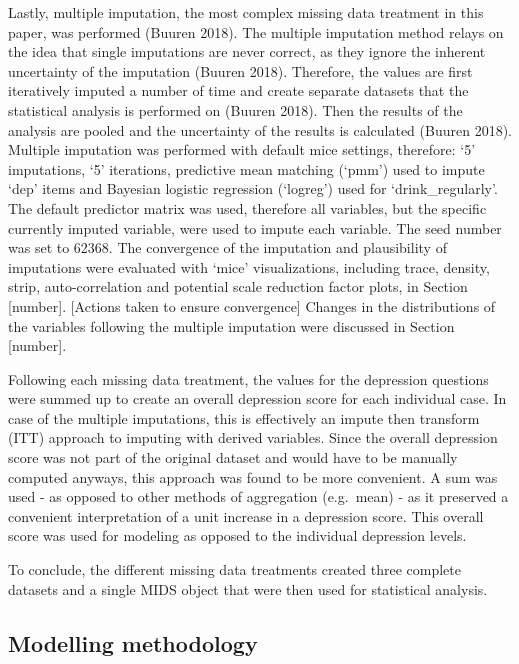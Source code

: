 \documentclass[
]{article}
\begin{document}
Lastly, multiple imputation, the most complex missing data treatment in this paper, was performed (Buuren 2018). The multiple imputation method relays on the idea that single imputations are never correct, as they ignore the inherent uncertainty of the imputation (Buuren 2018). Therefore, the values are first iteratively imputed a number of time and create separate datasets that the statistical analysis is performed on (Buuren 2018). Then the results of the analysis are pooled and the uncertainty of the results is calculated (Buuren 2018). Multiple imputation was performed with default mice settings, therefore: `5' imputations, `5' iterations, predictive mean matching (`pmm') used to impute `dep' items and Bayesian logistic regression (`logreg') used for `drink\_regularly'. The default predictor matrix was used, therefore all variables, but the specific currently imputed variable, were used to impute each variable. The seed number was set to 62368. The convergence of the imputation and plausibility of imputations were evaluated with `mice' visualizations, including trace, density, strip, auto-correlation and potential scale reduction factor plots, in Section {[}number{]}. {[}Actions taken to ensure convergence{]} Changes in the distributions of the variables following the multiple imputation were discussed in Section {[}number{]}.

Following each missing data treatment, the values for the depression questions were summed up to create an overall depression score for each individual case. In case of the multiple imputations, this is effectively an impute then transform (ITT) approach to imputing with derived variables. Since the overall depression score was not part of the original dataset and would have to be manually computed anyways, this approach was found to be more convenient. A sum was used - as opposed to other methods of aggregation (e.g.~mean) - as it preserved a convenient interpretation of a unit increase in a depression score. This overall score was used for modeling as opposed to the individual depression levels.

To conclude, the different missing data treatments created three complete datasets and a single MIDS object that were then used for statistical analysis.

\hypertarget{modelling-methodology}{%
\subsection{Modelling methodology}\label{modelling-methodology}}
\end{document}
